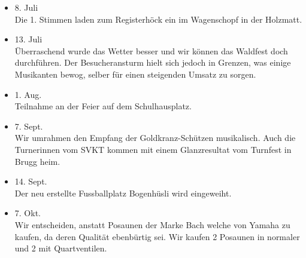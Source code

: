 \begin{history}
\begin{itemize}
        \item 8. Juli\\
              Die 1. Stimmen laden zum Registerhöck ein im Wagenschopf in der
              Holzmatt.

        \item 13. Juli\\
              Überraschend wurde das Wetter besser und wir können das Waldfest doch
              durchführen. Der Besucheransturm hielt sich jedoch in Grenzen, was
              einige Musikanten bewog, selber für einen steigenden Umsatz zu sorgen.

        \item 1. Aug.\\
              Teilnahme an der Feier auf dem Schulhausplatz.

        \item 7. Sept.\\
              Wir umrahmen den Empfang der Goldkranz-Schützen musikalisch. Auch die
              Turnerinnen vom SVKT kommen mit einem Glanzresultat vom Turnfest in
              Brugg heim.

        \item 14. Sept.\\
              Der neu erstellte Fussballplatz Bogenhüsli wird eingeweiht.

        \item 7. Okt.\\
              Wir entscheiden, anstatt Posaunen der Marke Bach welche von Yamaha zu
              kaufen, da deren Qualität ebenbürtig sei. Wir kaufen 2 Posaunen in
              normaler und 2 mit Quartventilen.



    \end{itemize}

\end{history}
